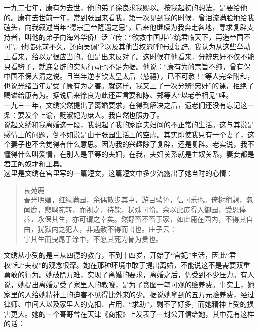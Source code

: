 一九二七年，康有为去世，他的弟子徐良求我赐以。按我起初的想法，是要给他的。康在去世前一年，常到张园来看我，第一次见到我的时候，曾泪流满脸地给我磕头，向我叙述当年“德宗皇帝隆遇之思”，后来他继续为我奔走各地，寻求复辟支持者，叫他的弟子向海外华侨广泛宣传：“欲救中国非宣统君临天下，再造帝国不可”。他临死前不久，还向吴佩孚以及其他当权派呼吁过复辟。我认为从这些举动上看来，给以是很应当的。但是出来反对了。这时候在他看来，分辨忠奸不仅不能只看辫子，就连复辟的实际行动也不足为据。他说：“康有为的宗旨不纯，曾有保中国不保大清之说。且当年逆孝钦太皇太后（慈禧），已不可赦！”等人完全附和，也说光绪当年是受了康有为之害。就这样，我又上了一次分辨“忠奸”的课，拒绝了赐谥给康有为。据说后来徐良为此还声言要和陈、郑等人“以老拳相见”哩。\\

一九三一年，文绣突然提出了离婚要求，在得到解决之后，遗老们还没有忘记这一条：要发个上谕，贬淑妃为庶人。我自然也照办了。\\

说起文绣和我离婚这一段，我想起了我的家庭夫妇间的不正常的生活。这与其说是感情上的问题，倒不如说是由于张园生活上的空虚。其实即使我只有一个妻子，这个妻子也不会觉得有什么意思。因为我的兴趣除了复辟，还是复辟。老实说，我不懂得什么叫爱情，在别人是平等的夫妇，在我，夫妇关系就是主奴关系，妻妾都是君王的奴才和工具。\\

这里是文绣在宫里写的一篇短文，这篇短文中多少流露出了她当时的心情：\\

\begin{quote}
	哀苑鹿\\

春光明媚，红绿满园，余偶散步其中，游目骋怀，信可乐也。倚树稍憩，忽闻鹿，悲鸣宛转，而视之，待毙，状殊可怜。余以此庞得入御园，受恩俸养，永保其生，亦可谓之幸矣。然野畜不畜于家，如此鹿在园内，不得其自由，犹狱内之犯人，非遇赦不得而出也。庄子云：\\

宁其生而曳尾于涂中，不愿其死为骨为贵也。\\
\end{quote}

文绣从小受的是三从四德的教育，不到十四岁，开始了“宫妃”生活，因此“君权”和“夫权”的观念很深。她在那种环境中敢于提出离婚，不能说这不是需要双重勇敢的行为。她破除万难，实现了离婚的要求，离婚之后，仍受到不少压力。有人说，她提出离婚是受了家里人的教唆，是为了贪图一笔可观的赡养费。事实上，她家里的人给她精神上的迫害不见得比外来的少。据说她拿到的五万元赡养费，经过律师、中间人以及家里人的克扣、占用、“求助”，剩不了好多，而她精神上受的损害更大。她的一个哥哥曾在天津《商报》上发表了一封公开信给她，其中竟有这样的话：\\

